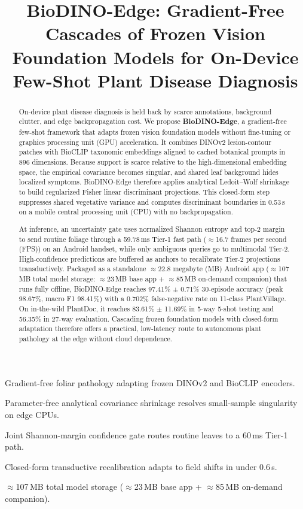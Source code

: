 \documentclass[preprint,12pt]{elsarticle}
\begin{document}
\begin{frontmatter}

\title{BioDINO-Edge: Gradient-Free Cascades of Frozen Vision Foundation Models for On-Device Few-Shot Plant Disease Diagnosis}

\begin{abstract}
On-device plant disease diagnosis is held back by scarce annotations, background clutter, and edge backpropagation cost. We propose \textbf{BioDINO-Edge}, a gradient-free few-shot framework that adapts frozen vision foundation models without fine-tuning or graphics processing unit (GPU) acceleration. It combines DINOv2 lesion-contour patches with BioCLIP taxonomic embeddings aligned to cached botanical prompts in 896 dimensions. Because support is scarce relative to the high-dimensional embedding space, the empirical covariance becomes singular, and shared leaf background hides localized symptoms. BioDINO-Edge therefore applies analytical Ledoit--Wolf shrinkage to build regularized Fisher linear discriminant projections. This closed-form step suppresses shared vegetative variance and computes discriminant boundaries in 0.53\,s on a mobile central processing unit (CPU) with no backpropagation.

At inference, an uncertainty gate uses normalized Shannon entropy and top-2 margin to send routine foliage through a 59.78\,ms Tier-1 fast path ($\approx$16.7 frames per second (FPS)) on an Android handset, while only ambiguous queries go to multimodal Tier-2. High-confidence predictions are buffered as anchors to recalibrate Tier-2 projections transductively. Packaged as a standalone $\approx$22.8 megabyte (MB) Android app ($\approx$107\,MB total model storage: $\approx$23\,MB base app + $\approx$85\,MB on-demand companion) that runs fully offline, BioDINO-Edge reaches 97.41\% $\pm$ 0.71\% 30-episode accuracy (peak 98.67\%, macro F1 98.41\%) with a 0.702\% false-negative rate on 11-class PlantVillage. On in-the-wild PlantDoc, it reaches 83.61\% $\pm$ 11.69\% in 5-way 5-shot testing and 56.35\% in 27-way evaluation. Cascading frozen foundation models with closed-form adaptation therefore offers a practical, low-latency route to autonomous plant pathology at the edge without cloud dependence.
\end{abstract}

\begin{highlights}
\item Gradient-free foliar pathology adapting frozen DINOv2 and BioCLIP encoders.
\item Parameter-free analytical covariance shrinkage resolves small-sample singularity on edge CPUs.
\item Joint Shannon-margin confidence gate routes routine leaves to a 60\,ms Tier-1 path.
\item Closed-form transductive recalibration adapts to field shifts in under 0.6\,s.
\item $\approx$107\,MB total model storage ($\approx$23\,MB base app + $\approx$85\,MB on-demand companion).
\end{highlights}


\end{frontmatter}
\end{document}
